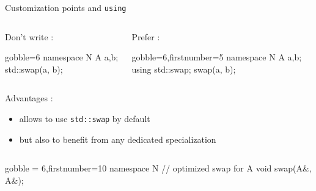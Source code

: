 \begin{frame}[fragile]
  \begin{block}{Customization points and \texttt{using}}
    \begin{columns}
      \begin{column}{.35\textwidth}
        Don't write :
        \begin{cppcode*}{gobble=6}
          namespace N {
            A a,b;
            std::swap(a, b);
          }
        \end{cppcode*}
      \end{column}
      \begin{column}{.35\textwidth}
        Prefer :
        \begin{cppcode*}{gobble=6,firstnumber=5}
          namespace N {
            A a,b;
            using std::swap;
            swap(a, b);
          }
        \end{cppcode*}
      \end{column}
    \end{columns}
    \vspace{.2cm}
    Advantages :
    \begin{itemize}
    \item allows to use \texttt{std::swap} by default
    \item but also to benefit from any dedicated specialization
    \end{itemize}
    \begin{columns}
      \begin{column}{.7\textwidth}
        \begin{cppcode*}{gobble = 6,firstnumber=10}
          namespace N {
            // optimized swap for A
            void swap(A&, A&);
          }
        \end{cppcode*}
      \end{column}
    \end{columns}
  \end{block}
\end{frame}
